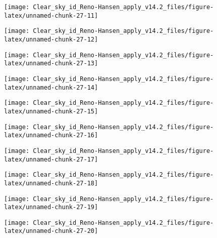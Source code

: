 \documentclass[
  10pt,
  a4paper,oneside]{article}
\begin{document}
\begin{center}\texttt{[image: Clear\_sky\_id\_Reno-Hansen\_apply\_v14.2\_files/figure-latex/unnamed-chunk-27-11]} \end{center}

\begin{center}\texttt{[image: Clear\_sky\_id\_Reno-Hansen\_apply\_v14.2\_files/figure-latex/unnamed-chunk-27-12]} \end{center}

\begin{center}\texttt{[image: Clear\_sky\_id\_Reno-Hansen\_apply\_v14.2\_files/figure-latex/unnamed-chunk-27-13]} \end{center}

\begin{center}\texttt{[image: Clear\_sky\_id\_Reno-Hansen\_apply\_v14.2\_files/figure-latex/unnamed-chunk-27-14]} \end{center}

\begin{center}\texttt{[image: Clear\_sky\_id\_Reno-Hansen\_apply\_v14.2\_files/figure-latex/unnamed-chunk-27-15]} \end{center}

\begin{center}\texttt{[image: Clear\_sky\_id\_Reno-Hansen\_apply\_v14.2\_files/figure-latex/unnamed-chunk-27-16]} \end{center}

\begin{center}\texttt{[image: Clear\_sky\_id\_Reno-Hansen\_apply\_v14.2\_files/figure-latex/unnamed-chunk-27-17]} \end{center}

\begin{center}\texttt{[image: Clear\_sky\_id\_Reno-Hansen\_apply\_v14.2\_files/figure-latex/unnamed-chunk-27-18]} \end{center}

\begin{center}\texttt{[image: Clear\_sky\_id\_Reno-Hansen\_apply\_v14.2\_files/figure-latex/unnamed-chunk-27-19]} \end{center}

\begin{center}\texttt{[image: Clear\_sky\_id\_Reno-Hansen\_apply\_v14.2\_files/figure-latex/unnamed-chunk-27-20]} \end{center}
\end{document}

